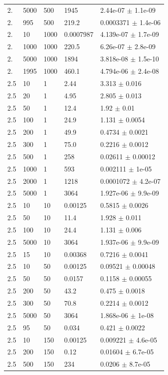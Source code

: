 \begin{longtable}{lllll}
	2. & 5000 & 500 & 1945 & 2.44e-07 $\pm$ 1.1e-09 \\
	2. & 995 & 500 & 219.2 & 0.0003371 $\pm$ 1.4e-06 \\
	2. & 10 & 1000 & 0.0007987 & 4.139e-07 $\pm$ 1.7e-09 \\
	2. & 1000 & 1000 & 220.5 & 6.26e-07 $\pm$ 2.8e-09 \\
	2. & 5000 & 1000 & 1894 & 3.818e-08 $\pm$ 1.5e-10 \\
	2. & 1995 & 1000 & 460.1 & 4.794e-06 $\pm$ 2.4e-08 \\
	2.5 & 10 & 1 & 2.44 & 3.313 $\pm$ 0.016 \\
	2.5 & 20 & 1 & 4.95 & 2.805 $\pm$ 0.013 \\
	2.5 & 50 & 1 & 12.4 & 1.92 $\pm$ 0.01 \\
	2.5 & 100 & 1 & 24.9 & 1.131 $\pm$ 0.0054 \\
	2.5 & 200 & 1 & 49.9 & 0.4734 $\pm$ 0.0021 \\
	2.5 & 300 & 1 & 75.0 & 0.2216 $\pm$ 0.0012 \\
	2.5 & 500 & 1 & 258 & 0.02611 $\pm$ 0.00012 \\
	2.5 & 1000 & 1 & 593 & 0.002111 $\pm$ 1e-05 \\
	2.5 & 2000 & 1 & 1218 & 0.0001072 $\pm$ 4.2e-07 \\
	2.5 & 5000 & 1 & 3064 & 1.927e-06 $\pm$ 9.9e-09 \\
	2.5 & 10 & 10 & 0.00125 & 0.5815 $\pm$ 0.0026 \\
	2.5 & 50 & 10 & 11.4 & 1.928 $\pm$ 0.011 \\
	2.5 & 100 & 10 & 24.4 & 1.131 $\pm$ 0.006 \\
	2.5 & 5000 & 10 & 3064 & 1.937e-06 $\pm$ 9.9e-09 \\
	2.5 & 15 & 10 & 0.00368 & 0.7216 $\pm$ 0.0041 \\
	2.5 & 10 & 50 & 0.00125 & 0.09521 $\pm$ 0.00048 \\
	2.5 & 50 & 50 & 0.0157 & 0.1158 $\pm$ 0.00055 \\
	2.5 & 200 & 50 & 43.2 & 0.475 $\pm$ 0.0018 \\
	2.5 & 300 & 50 & 70.8 & 0.2214 $\pm$ 0.0012 \\
	2.5 & 5000 & 50 & 3064 & 1.868e-06 $\pm$ 1e-08 \\
	2.5 & 95 & 50 & 0.034 & 0.421 $\pm$ 0.0022 \\
	2.5 & 10 & 150 & 0.00125 & 0.009221 $\pm$ 4.6e-05 \\
	2.5 & 200 & 150 & 0.12 & 0.01604 $\pm$ 6.7e-05 \\
	2.5 & 500 & 150 & 234 & 0.0206 $\pm$ 8.7e-05 \\

\end{longtable}
